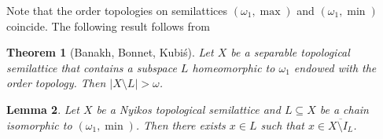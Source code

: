 \documentclass[12pt, twoside, leqno]{article}
\newtheorem{theorem}{Theorem}[section]
\newtheorem{lemma}[theorem]{Lemma}
\theoremstyle{definition}
\numberwithin{equation}{section}
\newcommand{\w}{\omega}
\newcommand{\var}{\varnothing}
\begin{document}


Note that the order topologies on semilattices $(\w_1,\max)$ and $(\w_1,\min)$ coincide. %
The following result follows from~\cite[Theorem 1]{BBK}

\begin{theorem}[Banakh, Bonnet, Kubi\'s]\label{BBK}
Let $X$ be a separable topological semilattice that contains a subspace $L$ homeomorphic to $\w_1$ endowed with the order topology. Then $|X\setminus L|>\w$.    
\end{theorem}


\begin{lemma}\label{good}
Let $X$ be a Nyikos topological semilattice and $L\subseteq X$ be a chain isomorphic to $(\w_1,\min)$. Then there exists $x\in L$ such that $x\in \overline{X\setminus I_L}$.  
\end{lemma}
\end{document}
